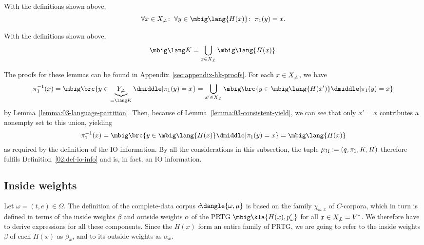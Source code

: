 \begin{lemma}\label{lemma:03-consistent-yield}
 With the definitions shown above,
 \[
  \forall x\in X_{\not\bot}\colon\;
  \forall y\in \mbig\lang{H(x)}\colon\;
  \pi_1(y) = x.
 \]
\end{lemma}

\begin{lemma}\label{lemma:03-language-partition}
 With the definitions shown above,
 \[
  \mbig\lang K = \bigcup_{x\in X_{\not\bot}} \mbig\lang{H(x)}.
 \]
\end{lemma}

The proofs for these lemmas can be found in Appendix~\ref{sec:appendix-hk-proofs}. For each $x\in X_{\not\bot}$, we have
\[
 \pi_1^{-1}(x)
 = \mbig\brc{y\in \underbrace{Y_{\not\bot}}_{=\lang K} \pipe \pi_1(y) = x}
 = \bigcup_{x'\in X_{\not\bot}} \mbig\brc{y\in\mbig\lang{H(x')} \pipe \pi_1(y) = x}
\]
by Lemma~\ref{lemma:03-language-partition}. Then, because of
Lemma~\ref{lemma:03-consistent-yield}, we can see that only $x'=x$ contributes
a nonempty set to this union, yielding
\[
 \pi_1^{-1}(x) = \mbig\brc{y\in\mbig\lang{H(x)} \pipe \pi_1(y) = x} = \mbig\lang{H(x)}
\]
as required by the definition of the IO information. By all the considerations
in this subsection, the tuple $\mu_\mathcal H := (q,\pi_1,K,H)$ therefore fulfils
Definition~\ref{02:def-io-info} and is, in fact, an IO information.


\subsection{Inside weights}

Let $\omega = (t,e)\in\Omega$. The definition of the complete-data corpus
$c\!\dangle{\omega,\mu}$ is based on the family $\chi_{\omega,x}$ of
$C$-corpora, which in turn is defined in terms of the inside weights $\beta$
and outside weights $\alpha$ of the PRTG $\mbig\kla{H(x),p_\omega'}$ for all
$x\in X_{\not\bot}=V^*$. We therefore have to derive expressions for all these
components. Since the $H(x)$ form an entire family of PRTG, we are going to
refer to the inside weights $\beta$ of each $H(x)$ as $\beta_x$, and to its
outside weights as $\alpha_x$.

